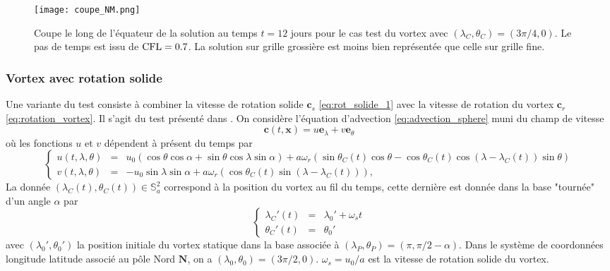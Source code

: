 \begin{figure}[htbp]
\begin{center}
\texttt{[image: coupe\_NM.png]}
\end{center}
\caption{Coupe le long de l'équateur de la solution au temps $t=12$ jours pour le cas test du vortex \cite{Nair2002} avec $(\lambda_C, \theta_C) = (3 \pi / 4,0)$. Le pas de temps est issu de $\text{CFL} = 0.7$. La solution sur grille grossière est moins bien représentée que celle sur grille fine.}
\label{fig:coupe_NM}
\end{figure}









\subsubsection{Vortex avec rotation solide}

Une variante du test \cite{Nair2002} consiste à combiner la vitesse de rotation solide $\mathbf{c}_s$ \eqref{eq:rot_solide_1} avec la vitesse de rotation du vortex $\mathbf{c}_r$ \eqref{eq:rotation_vortex}. Il s'agit du test présenté dans \cite{Nair2008}.
On considère l'équation d'advection \eqref{eq:advection_sphere} muni du champ de vitesse
\begin{equation}
\mathbf{c}(t,\mathbf{x}) = u \mathbf{e}_{\lambda} + v \mathbf{e}_{\theta}
\end{equation}
où les fonctions $u$ et $v$ dépendent à présent du temps par 
\begin{equation}
\left\lbrace
\begin{array}{rcl}
u(t,\lambda, \theta) & = & u_0 \left( \cos \theta \cos \alpha + \sin \theta \cos \lambda \sin \alpha \right) + a \omega_r \left( \sin \theta_C(t) \cos \theta - \cos \theta_C(t) \cos (\lambda - \lambda_C(t)) \sin \theta \right) \\
v(t,\lambda, \theta) & = & - u_0 \sin \lambda \sin \alpha + a \omega_r \left( \cos \theta_C(t) \sin (\lambda - \lambda_C(t)) \right),
\end{array}
\right.
\label{eq:vitesse_NJ}
\end{equation}
La donnée $(\lambda_C(t), \theta_C(t)) \in \mathbb{S}_a^2$ correspond à la position du vortex au fil du temps, cette dernière est donnée dans la base "tournée" d'un angle $\alpha$ par
\begin{equation}
\label{eq:vortexcenter1}
\left\lbrace
\begin{array}{rcl}
\lambda_C'(t) & = & \lambda_0' + \omega_s t \\
\theta_C'(t) & = & \theta_0'
\end{array}
\right.
\end{equation}
avec $(\lambda_0', \theta_0')$ la position initiale du vortex statique dans la base associée à $(\lambda_P, \theta_P)=(\pi, \pi/2-\alpha)$. Dans le système de coordonnées longitude latitude associé au pôle Nord $\mathbf{N}$, on a $(\lambda_0,\theta_0)=(3 \pi / 2, 0)$. $\omega_s = u_0/a$ est la vitesse de rotation solide du vortex. 

